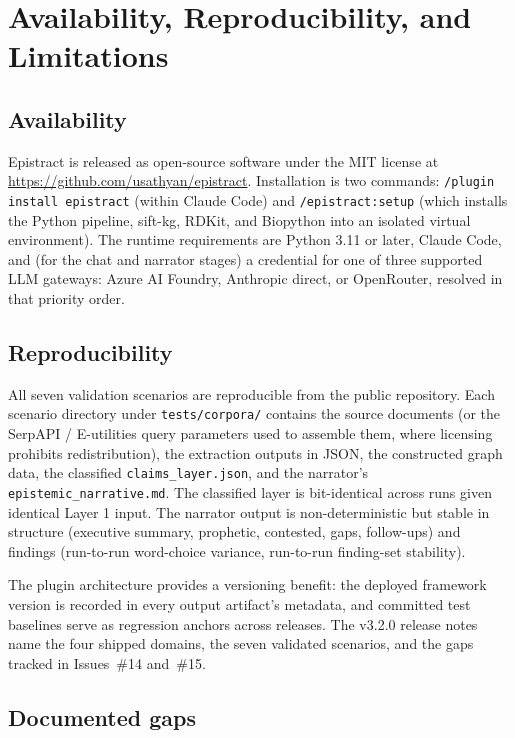\section{Availability, Reproducibility, and Limitations}
\label{sec:availability}

\subsection{Availability}

Epistract is released as open-source software under the MIT license at \url{https://github.com/usathyan/epistract}. Installation is two commands: \texttt{/plugin install epistract} (within Claude Code) and \texttt{/epistract:setup} (which installs the Python pipeline, sift-kg, RDKit, and Biopython into an isolated virtual environment). The runtime requirements are Python 3.11 or later, Claude Code, and (for the chat and narrator stages) a credential for one of three supported LLM gateways: Azure AI Foundry, Anthropic direct, or OpenRouter, resolved in that priority order.

\subsection{Reproducibility}

All seven validation scenarios are reproducible from the public repository. Each scenario directory under \texttt{tests/corpora/} contains the source documents (or the SerpAPI / E-utilities query parameters used to assemble them, where licensing prohibits redistribution), the extraction outputs in JSON, the constructed graph data, the classified \texttt{claims\_layer.json}, and the narrator's \texttt{epistemic\_narrative.md}. The classified layer is bit-identical across runs given identical Layer 1 input. The narrator output is non-deterministic but stable in structure (executive summary, prophetic, contested, gaps, follow-ups) and findings (run-to-run word-choice variance, run-to-run finding-set stability).

The plugin architecture provides a versioning benefit: the deployed framework version is recorded in every output artifact's metadata, and committed test baselines serve as regression anchors across releases. The v3.2.0 release notes name the four shipped domains, the seven validated scenarios, and the gaps tracked in Issues~\#14 and~\#15.

\subsection{Documented gaps}

